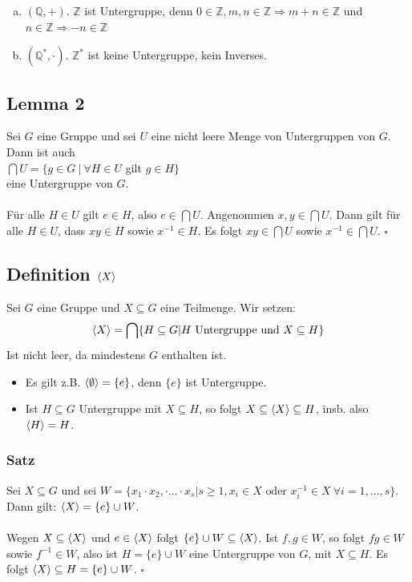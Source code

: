 \begin{enumerate}[(a)]
	\item $(\mathds{Q}, +)$. $\mathds{Z}$  ist Untergruppe, denn $0 \in \mathds{Z}, m,n \in \mathds{Z} \Rightarrow m+n\in \mathds{Z}$ und $n\in \mathds{Z} \Rightarrow -n\in \mathds{Z}$
	\item $(\mathds{Q}^*,\cdot)$. $\mathds{Z}^*$ ist keine Untergruppe, kein Inverses.
\end{enumerate}

\subsection{Lemma 2}
\label{sub:lemma_2}
Sei $G$ eine Gruppe und sei $U$ eine nicht leere Menge von Untergruppen von $G$. Dann ist auch\\
$\bigcap U = \{g\in G~|~\forall H\in U$ gilt $g\in H\}$\\
eine Untergruppe von $G$.\\
\\
Für alle $H\in U$ gilt $e\in H$, also $e\in \bigcap U$. Angenommen $x,y\in \bigcap U$. Dann gilt für alle $H\in U$, dass $xy\in H$ sowie $x^{-1}\in H$. Es folgt $xy\in \bigcap U$ sowie $x^{-1}\in \bigcap U$.
\hfill $\square$

\subsection{Definition $\langle X \rangle$}
\label{sub:def_lhX}
Sei $G$ eine Gruppe und $X \subseteq G$ eine Teilmenge. Wir setzen:
\[\langle X \rangle=\bigcap\{H\subseteq G | H \text{ Untergruppe und } X \subseteq H\}\]
Ist nicht leer, da mindestens $G$ enthalten ist.
\begin{itemize}
	\item Es gilt z.B. $\langle \emptyset \rangle=\{e\}$, denn $\{e\}$ ist Untergruppe.
	\item Ist $H \subseteq G$ Untergruppe mit $X \subseteq H$, so folgt $X\subseteq \langle X \rangle \subseteq H$, insb. also $\langle H \rangle=H$.
\end{itemize}

\subsubsection*{Satz}
Sei $X \subseteq G$ und sei $W=\{x_1\cdot x_2,\cdot \dots \cdot x_s | s\ge 1, x_i\in X \text{ oder } x_i^{-1}\in X ~\forall i=1,\dots,s\}$.\\
Dann gilt: $ \langle X \rangle=\{e\}\cup W$.\\
\\
Wegen $X\subseteq \langle X \rangle$ und $e\in \langle X \rangle$ folgt $\{e\}\cup W\subseteq \langle X \rangle$. Ist $f,g\in W$, so folgt $fg\in W$ sowie $f^{-1}\in W$, also ist $H=\{e\}\cup W$ eine Untergruppe von $G$, mit $X\subseteq H$. Es folgt $\langle X \rangle\subseteq H=\{e\}\cup W$.
\hfill $\square$

